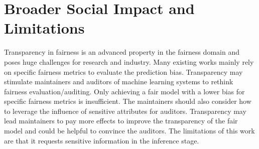 \documentclass[letterpaper]{article} %
\theoremstyle{plain}
\theoremstyle{definition}
\theoremstyle{remark}
\begin{document}
\section{Broader Social Impact and Limitations}\label{app:impact}
Transparency in fairness is an advanced property in the fairness domain and poses huge challenges for research and industry. Many existing works mainly rely on specific fairness metrics to evaluate the prediction bias. Transparency may stimulate maintainers and auditors of machine learning systems to rethink fairness evaluation/auditing. Only achieving a fair model with a lower bias for specific fairness metrics is insufficient. The maintainers should also consider how to leverage the influence of sensitive attributes for auditors. Transparency may lead maintainers to pay more effects to improve the transparency of the fair model and could be helpful to convince the auditors. The limitations of this work are that it requests sensitive information in the inference stage.
\end{document}
